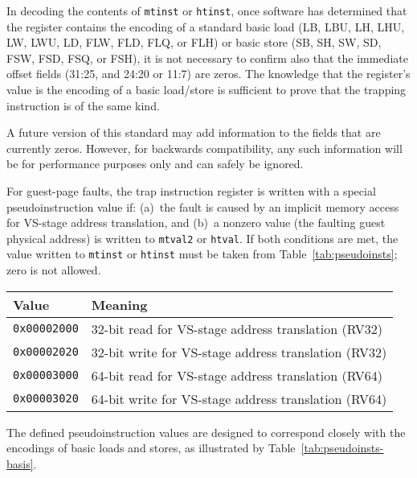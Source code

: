 \begin{commentary}
In decoding the contents of {\tt mtinst} or {\tt htinst}, once software
has determined that the register contains the encoding of a standard
basic load (LB, LBU, LH, LHU, LW, LWU, LD, FLW, FLD, FLQ, or FLH) or basic
store (SB, SH, SW, SD, FSW, FSD, FSQ, or FSH), it is not necessary to confirm
also that the immediate offset fields (31:25, and 24:20 or 11:7) are
zeros.
The knowledge that the register's value is the encoding of a basic
load/store is sufficient to prove that the trapping instruction is of the
same kind.

A future version of this standard may add information to the fields that
are currently zeros.
However, for backwards compatibility, any such information will be for
performance purposes only and can safely be ignored.
\end{commentary}

For guest-page faults, the trap instruction register is written with a
special pseudoinstruction value if:
(a)~the fault is caused by an implicit memory access for VS-stage address
translation, and
(b)~a nonzero value (the faulting guest physical address) is written to
{\tt mtval2} or {\tt htval}.
If both conditions are met, the value written to {\tt mtinst} or
{\tt htinst} must be taken from Table~\ref{tab:pseudoinsts};
zero is not allowed.

\begin{table*}[h!]
\begin{center}
\begin{tabular}{|l|l|}
\hline
Value            & Meaning \\
\hline
{\tt 0x00002000} & 32-bit read for VS-stage address translation (RV32) \\
{\tt 0x00002020} & 32-bit write for VS-stage address translation (RV32) \\
\hline
{\tt 0x00003000} & 64-bit read for VS-stage address translation (RV64) \\
{\tt 0x00003020} & 64-bit write for VS-stage address translation (RV64) \\
\hline
\end{tabular}
\end{center}
\caption{Special pseudoinstruction values for guest-page faults.
The RV32 values are used when VSXLEN=32, and the RV64 values when VSXLEN=64.}
\label{tab:pseudoinsts}
\end{table*}

The defined pseudoinstruction values are designed to correspond closely
with the encodings of basic loads and stores, as illustrated by
Table~\ref{tab:pseudoinsts-basis}.


